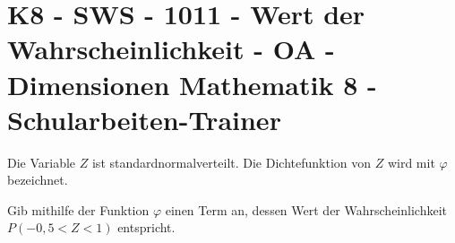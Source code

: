 \section{K8 - SWS - 1011 - Wert der Wahrscheinlichkeit - OA - Dimensionen Mathematik 8 - Schularbeiten-Trainer}

\begin{beispiel}[K8 - SWS]{1}
Die Variable $Z$ ist standardnormalverteilt. Die Dichtefunktion von $Z$ wird mit $\varphi$ bezeichnet.

Gib mithilfe der Funktion $\varphi$ einen Term an, dessen Wert der Wahrscheinlichkeit $P(-0,5<Z<1)$ entspricht.

\end{beispiel}